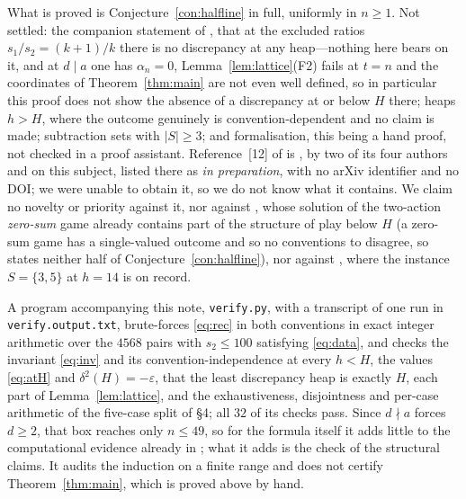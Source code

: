 \documentclass[11pt]{amsart}
\theoremstyle{definition}
\theoremstyle{remark}
\begin{document}
What is proved is Conjecture~\ref{con:halfline} in full, uniformly in $n\ge1$.
Not settled: the companion statement of \cite{BKLM}, that at the excluded ratios
$s_1/s_2=(k+1)/k$ there is no discrepancy at any heap---nothing here bears on
it, and at $d\mid a$ one has $\alpha_n=0$, Lemma~\ref{lem:lattice}(F2) fails at
$t=n$ and the coordinates of Theorem~\ref{thm:main} are not even well defined,
so in particular this proof does not show the absence of a discrepancy at or
below $H$ there; heaps $h>H$, where the outcome genuinely is
convention-dependent and no claim is made; subtraction sets with $|S|\ge3$; and
formalisation, this being a hand proof, not checked in a proof assistant.
Reference~[12] of \cite{BKLM} is \cite{KL}, by two of its four authors and on
this subject, listed there as \emph{in preparation}, with no arXiv identifier
and no DOI; we were unable to obtain it, so we do not know what it contains. We
claim no novelty or priority against it, nor against \cite{CLMW}, whose
solution of the two-action \emph{zero-sum} game already contains part of the
structure of play below $H$ (a zero-sum game has a single-valued outcome and so
no conventions to disagree, so \cite{CLMW} states neither half of
Conjecture~\ref{con:halfline}), nor against \cite{LMZ}, where the instance
$S=\{3,5\}$ at $h=14$ is on record.

A program accompanying this note, \texttt{verify.py}, with a transcript of one
run in \texttt{verify.output.txt}, brute-forces \eqref{eq:rec} in both
conventions in exact integer arithmetic over the $4568$ pairs with $s_2\le100$
satisfying \eqref{eq:data}, and checks the invariant \eqref{eq:inv} and its
convention-independence at every $h<H$, the values \eqref{eq:atH} and
$\delta^2(H)=-\varepsilon$, that the least discrepancy heap is exactly $H$,
each part of Lemma~\ref{lem:lattice}, and the exhaustiveness, disjointness and
per-case arithmetic of the five-case split of \S4; all $32$ of its checks pass.
Since $d\nmid a$ forces $d\ge2$, that box reaches only $n\le49$, so for the
formula itself it adds little to the computational evidence already in
\cite{BKLM}; what it adds is the check of the structural claims. It audits the
induction on a finite range and does not certify Theorem~\ref{thm:main}, which
is proved above by hand.
\end{document}
